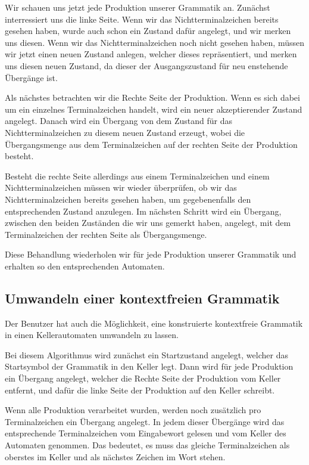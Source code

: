 Wir schauen uns jetzt jede Produktion unserer Grammatik an.
Zunächst interressiert uns die linke Seite. Wenn wir das Nichtterminalzeichen
bereits gesehen haben, wurde auch schon ein Zustand dafür angelegt, und wir
merken uns diesen. Wenn wir das Nichtterminalzeichen noch nicht gesehen haben,
müssen wir jetzt einen neuen Zustand anlegen, welcher dieses repräsentiert, und
merken uns diesen neuen Zustand, da dieser der Ausgangszustand
für neu enstehende Übergänge ist.\vspace{10pt}

Als nächstes betrachten wir die Rechte Seite der Produktion. Wenn es sich dabei
um ein einzelnes Terminalzeichen handelt, wird ein neuer akzeptierender Zustand
angelegt. Danach wird ein Übergang von dem Zustand für das Nichtterminalzeichen
zu diesem neuen Zustand erzeugt, wobei die Übergangsmenge aus dem
Terminalzeichen auf der rechten Seite der Produktion besteht.\vspace{10pt}

Besteht die rechte Seite allerdings aus einem Terminalzeichen und einem
Nichtterminalzeichen müssen wir wieder überprüfen, ob wir das
Nichtterminalzeichen bereits gesehen haben, um gegebenenfalls den
entsprechenden Zustand anzulegen. Im nächsten Schritt wird ein Übergang,
zwischen den beiden Zuständen die wir uns gemerkt haben, angelegt, mit dem
Terminalzeichen der rechten Seite als Übergangsmenge.\vspace{10pt}

Diese Behandlung wiederholen wir für jede Produktion unserer Grammatik und
erhalten so den entsprechenden Automaten.

\subsection{Umwandeln einer kontextfreien
Grammatik}\label{ConverToGrammarContextFree}

Der Benutzer hat auch die Möglichkeit, eine konstruierte kontextfreie Grammatik
in einen Kellerautomaten umwandeln zu lassen.\vspace{10pt}

Bei diesem Algorithmus wird zunächst ein Startzustand angelegt, welcher das
Startsymbol der Grammatik in den Keller legt. Dann wird für jede Produktion
ein Übergang angelegt, welcher die Rechte Seite der Produktion vom Keller
entfernt, und dafür die linke Seite der Produktion auf den Keller
schreibt.\vspace{10pt}

Wenn alle Produktion verarbeitet wurden, werden noch zusätzlich pro
Terminalzeichen ein Übergang angelegt. In jedem dieser Übergänge wird das
entsprechende Terminalzeichen vom Eingabewort gelesen und vom Keller des
Automaten genommen. Das bedeutet, es muss das gleiche Terminalzeichen als
oberstes im Keller  und als nächstes Zeichen im Wort stehen.\vspace{10pt}

